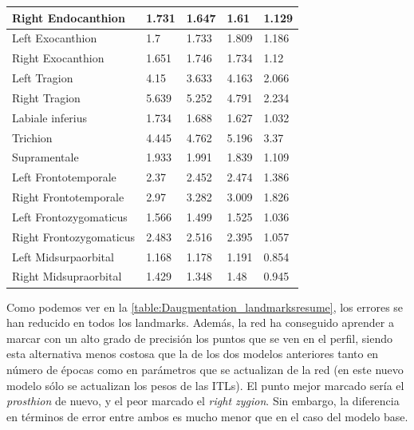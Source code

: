 \begin{table}[!ht]
\begin{tabular}{|l|l|l|l|l|}
                Right Endocanthion & 1.731 & 1.647 & 1.61 & \cellcolor{green!25}1.129 \\ \hline
                Left Exocanthion & 1.7 & 1.733 & 1.809 & \cellcolor{green!25}1.186 \\ \hline
                Right Exocanthion & 1.651 & 1.746 & 1.734 & \cellcolor{green!25}1.12 \\ \hline
                Left Tragion & 4.15 & 3.633 & 4.163 & \cellcolor{green!25}2.066 \\ \hline
                Right Tragion & 5.639 & 5.252 & 4.791 & \cellcolor{green!25}2.234 \\ \hline
                Labiale inferius & 1.734 & 1.688 & 1.627 & \cellcolor{green!25}1.032 \\ \hline
                Trichion & 4.445 & 4.762 & 5.196 & \cellcolor{green!25}3.37 \\ \hline
                Supramentale & 1.933 & 1.991 & 1.839 & \cellcolor{green!25}1.109 \\ \hline
                Left Frontotemporale & 2.37 & 2.452 & 2.474 & \cellcolor{green!25}1.386 \\ \hline
                Right Frontotemporale & 2.97 & 3.282 & 3.009 & \cellcolor{green!25}1.826 \\ \hline
                Left Frontozygomaticus & 1.566 & 1.499 & 1.525 & \cellcolor{green!25}1.036 \\ \hline
                Right Frontozygomaticus & 2.483 & 2.516 & 2.395 & \cellcolor{green!25}1.057 \\ \hline
                Left Midsurpaorbital & 1.168 & 1.178 & 1.191 &\cellcolor{green!25} 0.854 \\ \hline
                Right Midsupraorbital & 1.429 & 1.348 & 1.48 & \cellcolor{green!25}0.945 \\ \hline
            \end{tabular}
            \label{table:Daugmentation_landmarksresume}
        \end{table}

        \medskip

        \noindent Como podemos ver en la \autoref{table:Daugmentation_landmarksresume}, los errores se han reducido en todos los landmarks. Además, la red ha conseguido aprender a marcar con un alto grado de precisión los puntos que se ven en el perfil, siendo esta alternativa menos costosa que la de los dos modelos anteriores tanto en número de épocas como en parámetros que se actualizan de la red (en este nuevo modelo sólo se actualizan los pesos de las ITLs). El punto mejor marcado sería el \textit{prosthion} de nuevo, y el peor marcado el \textit{right zygion}. Sin embargo, la diferencia en términos de error entre ambos es mucho menor que en el caso del modelo base. 

